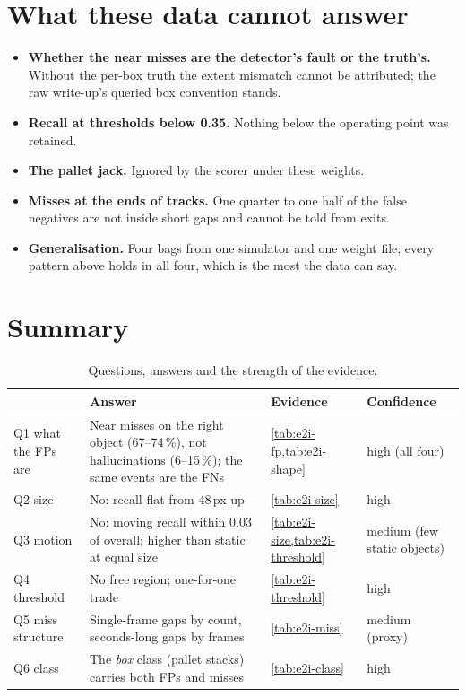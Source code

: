 \documentclass[11pt,a4paper,notitlepage]{report}
\begin{document}
\FloatBarrier
\section{What these data cannot answer}

\begin{itemize}
\item \textbf{Whether the near misses are the detector's fault or the
      truth's.} Without the per-box truth the extent mismatch cannot be
      attributed; the raw write-up's queried box convention stands.
\item \textbf{Recall at thresholds below \num{0.35}.} Nothing below the
      operating point was retained.
\item \textbf{The pallet jack.} Ignored by the scorer under these weights.
\item \textbf{Misses at the ends of tracks.} One quarter to one half of the
      false negatives are not inside short gaps and cannot be told from exits.
\item \textbf{Generalisation.} Four bags from one simulator and one weight
      file; every pattern above holds in all four, which is the most the data
      can say.
\end{itemize}

\section{Summary}

\begin{table}[htbp]
\centering\small
\caption{Questions, answers and the strength of the evidence.}
\label{tab:e2i-summary}
\begin{tabularx}{\textwidth}{lXXl}
\toprule
 & Answer & Evidence & Confidence \\
\midrule
Q1 what the FPs are & Near misses on the right object (67--74\,\%), not hallucinations (6--15\,\%); the same events are the FNs & \cref{tab:e2i-fp,tab:e2i-shape} & high (all four) \\
Q2 size & No: recall flat from 48\,px up & \cref{tab:e2i-size} & high \\
Q3 motion & No: moving recall within 0.03 of overall; higher than static at equal size & \cref{tab:e2i-size,tab:e2i-threshold} & medium (few static objects) \\
Q4 threshold & No free region; one-for-one trade & \cref{tab:e2i-threshold} & high \\
Q5 miss structure & Single-frame gaps by count, seconds-long gaps by frames & \cref{tab:e2i-miss} & medium (proxy) \\
Q6 class & The \emph{box} class (pallet stacks) carries both FPs and misses & \cref{tab:e2i-class} & high \\
\bottomrule
\end{tabularx}
\end{table}
\end{document}
